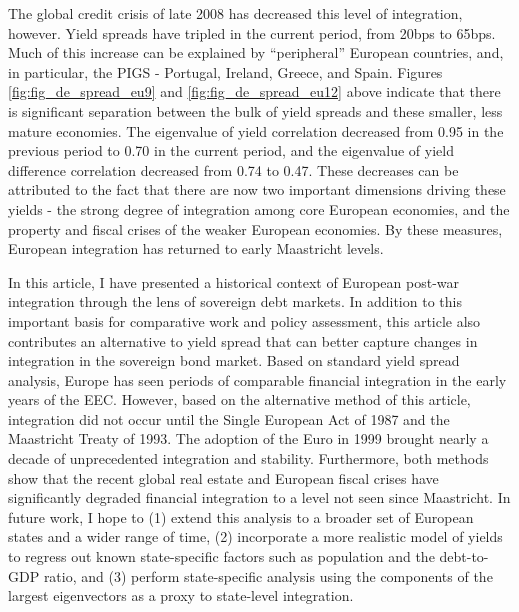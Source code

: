 \documentclass[3p]{elsarticle}
\begin{document}
The global credit crisis of late 2008 has decreased this level of integration, however.  Yield spreads have tripled in the current period, from 20bps to 65bps.  Much of this increase can be explained by ``peripheral'' European countries, and, in particular, the PIGS - Portugal, Ireland, Greece, and Spain.  Figures \ref{fig:fig_de_spread_eu9} and \ref{fig:fig_de_spread_eu12} above indicate that there is significant separation between the bulk of yield spreads and these smaller, less mature economies.  The eigenvalue of yield correlation decreased from 0.95 in the previous period to 0.70 in the current period, and the eigenvalue of yield difference correlation decreased from 0.74 to 0.47.  These decreases can be attributed to the fact that there are now two important dimensions driving these yields - the strong degree of integration among core European economies, and the property and fiscal crises of the weaker European economies.  By these measures, European integration has returned to early Maastricht levels.

In this article, I have presented a historical context of European post-war integration through the lens of sovereign debt markets.  In addition to this important basis for comparative work and policy assessment, this article also contributes an alternative to yield spread that can better capture changes in integration in the sovereign bond market. Based on standard yield spread analysis, Europe has seen periods of comparable financial integration in the early years of the EEC.  However, based on the alternative method of this article, integration did not occur until the Single European Act of 1987 and the Maastricht Treaty of 1993.  The adoption of the Euro in 1999 brought nearly a decade of unprecedented integration and stability.  Furthermore, both methods show that the recent global real estate and European fiscal crises have significantly degraded financial integration to a level not seen since Maastricht.  In future work, I hope to (1) extend this analysis to a broader set of European states and a wider range of time, (2) incorporate a more realistic model of yields to regress out known state-specific factors such as population and the debt-to-GDP ratio, and (3) perform state-specific analysis using the components of the largest eigenvectors as a proxy to state-level integration.  


\newpage
\end{document}
